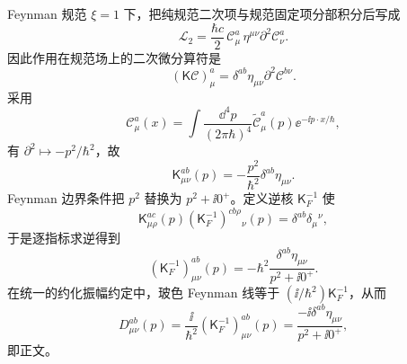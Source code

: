 \begin{derivation}
Feynman 规范 $\xi=1$ 下，把纯规范二次项与规范固定项分部积分后写成
\begin{equation*}
 \mathcal L_2
 =\frac{\hbar c}{2}\,
 \mathscr C_\mu^a\,\eta^{\mu\nu}\partial^2\mathscr C_\nu^a .
\end{equation*}
因此作用在规范场上的二次微分算符是
\begin{equation*}
 (\mathsf K\mathscr C)_\mu^a
 =\delta^{ab}\eta_{\mu\nu}\partial^2\mathscr C^{b\nu}.
\end{equation*}
采用
\begin{equation*}
 \mathscr C_\mu^a(x)
 =\int\frac{\dd^4p}{(2\pi\hbar)^4}
 \widetilde{\mathscr C}_\mu^a(p)
 \ee^{-\ii p\cdot x/\hbar},
\end{equation*}
有 $\partial^2\mapsto-p^2/\hbar^2$，故
\begin{equation*}
 \mathsf K_{\mu\nu}^{ab}(p)
 =-\frac{p^2}{\hbar^2}\delta^{ab}\eta_{\mu\nu}.
\end{equation*}
Feynman 边界条件把 $p^2$ 替换为 $p^2+\ii0^+$。定义逆核 $\mathsf K_F^{-1}$ 使
\begin{equation*}
 \mathsf K_{\mu\rho}^{ac}(p)
 (\mathsf K_F^{-1})^{cb\rho}{}_{\nu}(p)
 =\delta^{ab}\delta_\mu{}^\nu,
\end{equation*}
于是逐指标求逆得到
\begin{equation*}
 (\mathsf K_F^{-1})_{\mu\nu}^{ab}(p)
 =-\hbar^2\frac{\delta^{ab}\eta_{\mu\nu}}{p^2+\ii0^+}.
\end{equation*}
在统一的约化振幅约定中，玻色 Feynman 线等于 $(\ii/\hbar^2)\mathsf K_F^{-1}$，从而
\begin{equation*}
 D_{\mu\nu}^{ab}(p)
 =\frac{\ii}{\hbar^2}(\mathsf K_F^{-1})_{\mu\nu}^{ab}(p)
 =\frac{-\ii\delta^{ab}\eta_{\mu\nu}}{p^2+\ii0^+},
\end{equation*}
即正文。


\end{derivation}
